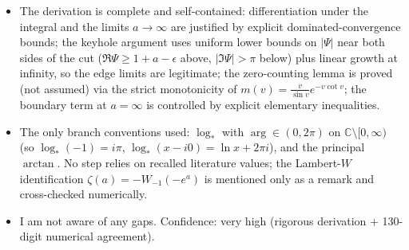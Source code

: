 \documentclass[11pt]{article}
\theoremstyle{remark}
\begin{document}
\begin{itemize}
\item The derivation is complete and self-contained: differentiation under the integral and the limits $a\to\infty$ are justified by explicit dominated-convergence bounds; the keyhole argument uses uniform lower bounds on $|\Psi|$ near both sides of the cut ($\Re\Psi\ge1+a-\epsilon$ above, $|\Im\Psi|>\pi$ below) plus linear growth at infinity, so the edge limits are legitimate; the zero-counting lemma is proved (not assumed) via the strict monotonicity of $m(v)=\frac{v}{\sin v}e^{-v\cot v}$; the boundary term at $a=\infty$ is controlled by explicit elementary inequalities.
\item The only branch conventions used: $\log_*$ with $\arg\in(0,2\pi)$ on $\mathbb{C}\setminus[0,\infty)$ (so $\log_*(-1)=i\pi$, $\log_*(x-i0)=\ln x+2\pi i$), and the principal $\arctan$. No step relies on recalled literature values; the Lambert-$W$ identification $\zeta(a)=-W_{-1}(-e^{a})$ is mentioned only as a remark and cross-checked numerically.
\item I am not aware of any gaps. Confidence: very high (rigorous derivation + 130-digit numerical agreement).
\end{itemize}
\end{document}
